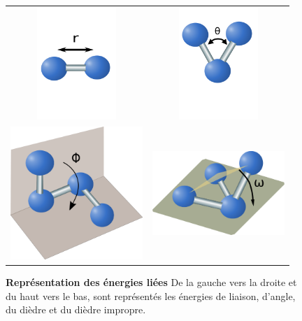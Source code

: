    \begin{figure}[!htbp]
     \centering
     \begin{tabular}{cc}
       \includegraphics[width=3cm]{figure/liaison.pdf} &
       \includegraphics[width=3cm]{figure/angle.pdf} \\
       \includegraphics[width=5cm]{figure/dihedre.pdf} &
       \includegraphics[width=5cm]{figure/impropre.pdf} \\

     \end{tabular}
     
     \caption{\textbf{Représentation des énergies liées} De la gauche vers la droite et du haut vers le bas, sont représentés les énergies de liaison, d'angle, du dièdre et du dièdre impropre.}
\label{graph:Eliees}
   \end{figure}

